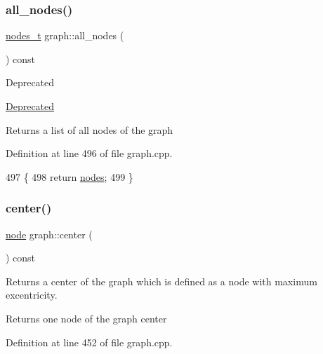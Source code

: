 \subsubsection{\texorpdfstring{all\+\_\+nodes()}{all\_nodes()}}
{\footnotesize\ttfamily \mbox{\hyperlink{edge_8h_a22ac17689106ba21a84e7bc54d1199d6}{nodes\+\_\+t}} graph\+::all\+\_\+nodes (\begin{DoxyParamCaption}{ }\end{DoxyParamCaption}) const\hspace{0.3cm}{\ttfamily [inherited]}}

\begin{DoxyRefDesc}{Deprecated}
\item[\mbox{\hyperlink{deprecated__deprecated000003}{Deprecated}}]\end{DoxyRefDesc}
\begin{DoxyReturn}{Returns}
a list of all nodes of the graph 
\end{DoxyReturn}


Definition at line 496 of file graph.\+cpp.


\begin{DoxyCode}
497 \{
498     \textcolor{keywordflow}{return} \mbox{\hyperlink{classgraph_a4ea0592e8eb7c26c5abad24546907726}{nodes}};
499 \}
\end{DoxyCode}
\mbox{\label{classgraph_a351617e023b4b6833ab650a70fc086e7}} 
\subsubsection{\texorpdfstring{center()}{center()}}
{\footnotesize\ttfamily \mbox{\hyperlink{classnode}{node}} graph\+::center (\begin{DoxyParamCaption}{ }\end{DoxyParamCaption}) const\hspace{0.3cm}{\ttfamily [inherited]}}

Returns a center of the graph which is defined as a node with maximum excentricity.

\begin{DoxyReturn}{Returns}
one node of the graph center 
\end{DoxyReturn}


Definition at line 452 of file graph.\+cpp.


